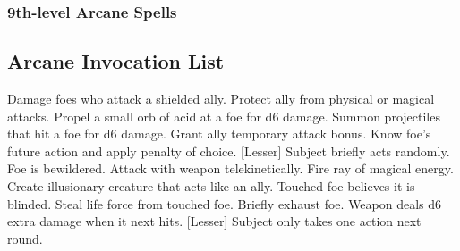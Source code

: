 \subsubsection{9th-level Arcane Spells} 
\begin{swspelllist}

    \SLmagesdisjunction[Abjur]
    \SLprohibitiongreater*

    \SLimprisonment[Conj]
    \SLshadowpuppet
    \SLsummonmonsterix
    \SLetherealness*

    \SLforesightgreater[Div]
    \SLrevelation
    \SLmomentofpresciencegreater*

    \SLholdmonster[Ench]
    \SLirresistibledance
    \SLweird
    \SLdominatemonster*

    \SLmeteorswarm[Evoc]
    \spellhead{}
    \SLclenchedfist*

    \SLshadowpuppet[Illus]
    \SLweird
    \SLfalsereality*

    \SLassimilate[Necro]
    \SLpowerwordkill
    \SLwailofthebanshee*

    \SLassimilate[Trans]
    \SLtransmuteanyobject
    \SLimprisonment
    \SLtimestop*

    \SLprismaticstorm[Univ]
\end{swspelllist}

\subsection{Arcane Invocation List}
\begin{swspelllist}
     Damage foes who attack a shielded ally.
     Protect ally from physical or magical attacks.
     Propel a small orb of acid at a foe for d6 damage.
     Summon projectiles that hit a foe for d6 damage.
     Grant ally temporary attack bonus.
     Know foe's future action and apply penalty of choice.
    [Lesser] Subject briefly acts randomly.
     Foe is bewildered.
     Attack with weapon telekinetically.
     Fire ray of magical energy.
     Create illusionary creature that acts like an ally.
     Touched foe believes it is blinded.
     Steal life force from touched foe.
     Briefly exhaust foe.
     Weapon deals d6 extra damage when it next hits.
    [Lesser] Subject only takes one action next round.
\end{swspelllist}


